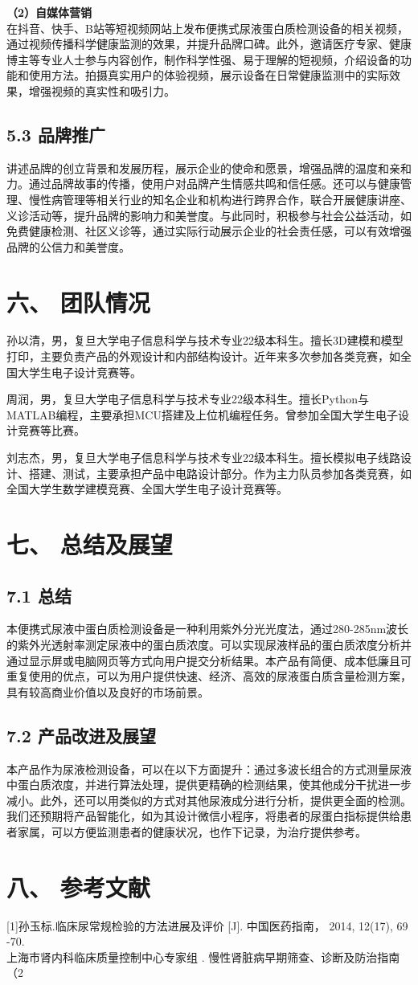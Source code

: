 \documentclass[a4paper,12pt]{article}
\begin{document}
\textbf{（2）自媒体营销}\\
在抖音、快手、B站等短视频网站上发布便携式尿液蛋白质检测设备的相关视频，通过视频传播科学健康监测的效果，并提升品牌口碑。此外，邀请医疗专家、健康博主等专业人士参与内容创作，制作科学性强、易于理解的短视频，介绍设备的功能和使用方法。拍摄真实用户的体验视频，展示设备在日常健康监测中的实际效果，增强视频的真实性和吸引力。

\subsection*{5.3 品牌推广}
讲述品牌的创立背景和发展历程，展示企业的使命和愿景，增强品牌的温度和亲和力。通过品牌故事的传播，使用户对品牌产生情感共鸣和信任感。还可以与健康管理、慢性病管理等相关行业的知名企业和机构进行跨界合作，联合开展健康讲座、义诊活动等，提升品牌的影响力和美誉度。与此同时，积极参与社会公益活动，如免费健康检测、社区义诊等，通过实际行动展示企业的社会责任感，可以有效增强品牌的公信力和美誉度。

\section*{六、 团队情况}
孙以清，男，复旦大学电子信息科学与技术专业22级本科生。擅长3D建模和模型打印，主要负责产品的外观设计和内部结构设计。近年来多次参加各类竞赛，如全国大学生电子设计竞赛等。

周润，男，复旦大学电子信息科学与技术专业22级本科生。擅长Python与MATLAB编程，主要承担MCU搭建及上位机编程任务。曾参加全国大学生电子设计竞赛等比赛。

刘志杰，男，复旦大学电子信息科学与技术专业22级本科生。擅长模拟电子线路设计、搭建、测试，主要承担产品中电路设计部分。作为主力队员参加各类竞赛，如全国大学生数学建模竞赛、全国大学生电子设计竞赛等。

\section*{七、 总结及展望}
\subsection*{7.1 总结}
本便携式尿液中蛋白质检测设备是一种利用紫外分光光度法，通过280-285nm波长的紫外光透射率测定尿液中的蛋白质浓度。可以实现尿液样品的蛋白质浓度分析并通过显示屏或电脑网页等方式向用户提交分析结果。本产品有简便、成本低廉且可重复使用的优点，可以为用户提供快速、经济、高效的尿液蛋白质含量检测方案，具有较高商业价值以及良好的市场前景。

\subsection*{7.2 产品改进及展望}
本产品作为尿液检测设备，可以在以下方面提升：通过多波长组合的方式测量尿液中蛋白质浓度，并进行算法处理，提供更精确的检测结果，使其他成分干扰进一步减小。此外，还可以用类似的方式对其他尿液成分进行分析，提供更全面的检测。我们还预期将产品智能化，如为其设计微信小程序，将患者的尿蛋白指标提供给患者家属，可以方便监测患者的健康状况，也作下记录，为治疗提供参考。

\section*{八、 参考文献}
[1]孙玉标.临床尿常规检验的方法进展及评价 [J]. 中国医药指南， 2014, 12(17), 69 -70.\\
\null[2]上海市肾内科临床质量控制中心专家组 . 慢性肾脏病早期筛查、诊断及防治指南 （2
\end{document}
